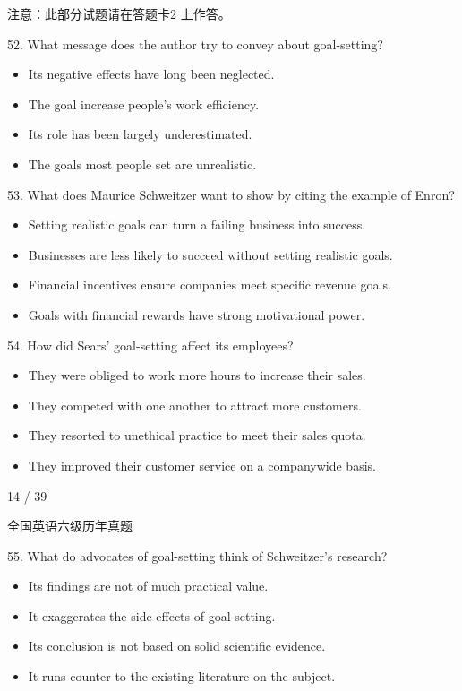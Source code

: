 \documentclass[UTF8,11pt]{ctexart}
\begin{document}
注意：此部分试题请在答题卡2 上作答。


52. What message does the author try to convey about goal-setting?


\begin{itemize}[leftmargin=2em,itemsep=.2em,topsep=.4em]\item[A.] Its negative effects have long been neglected.
\item[B.] The goal increase people’s work efficiency.
\item[C.] Its role has been largely underestimated.
\item[D.] The goals most people set are unrealistic.
\end{itemize}

53. What does Maurice Schweitzer want to show by citing the example of Enron?


\begin{itemize}[leftmargin=2em,itemsep=.2em,topsep=.4em]\item[A.] Setting realistic goals can turn a failing business into success.
\item[B.] Businesses are less likely to succeed without setting realistic goals.
\item[C.] Financial incentives ensure companies meet specific revenue goals.
\item[D.] Goals with financial rewards have strong motivational power.
\end{itemize}

54. How did Sears’ goal-setting affect its employees?


\begin{itemize}[leftmargin=2em,itemsep=.2em,topsep=.4em]\item[A.] They were obliged to work more hours to increase their sales.
\item[B.] They competed with one another to attract more customers.
\item[C.] They resorted to unethical practice to meet their sales quota.
\item[D.] They improved their customer service on a companywide basis.
\end{itemize}

14 / 39


全国英语六级历年真题


55. What do advocates of goal-setting think of Schweitzer’s research?


\begin{itemize}[leftmargin=2em,itemsep=.2em,topsep=.4em]\item[A.] Its findings are not of much practical value.
\item[B.] It exaggerates the side effects of goal-setting.
\item[C.] Its conclusion is not based on solid scientific evidence.
\item[D.] It runs counter to the existing literature on the subject.
\end{itemize}
\end{document}
